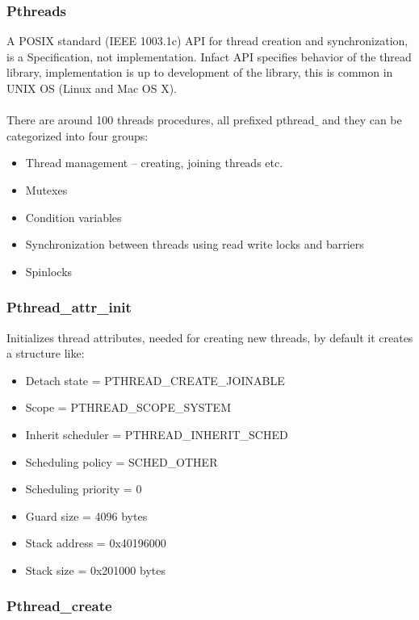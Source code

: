 \subsubsection{Pthreads}
A POSIX standard (IEEE 1003.1c) API for thread creation and synchronization, is a Specification, not implementation. Infact API specifies behavior of the thread library, implementation is up to development of the library, this is common in UNIX OS (Linux and Mac OS X).
\paragraph{}
There are around 100 threads procedures, all prefixed pthread$\_$ and
they can be categorized into four groups:

\begin{itemize}
    \item Thread management – creating, joining threads etc.
    \item Mutexes
    \item Condition variables
    \item Synchronization between threads using read write locks and
barriers
    \item  Spinlocks
\end{itemize}


\subsubsection{Pthread\_attr\_init}

Initializes thread attributes, needed for creating new threads, by default it creates a structure like:

\begin{itemize}
    \item[] Detach state = PTHREAD\_CREATE\_JOINABLE 
    \item[] Scope = PTHREAD\_SCOPE\_SYSTEM
    \item[] Inherit scheduler = PTHREAD\_INHERIT\_SCHED
    \item[] Scheduling policy = SCHED\_OTHER
    \item[] Scheduling priority = 0
    \item[] Guard size = 4096 bytes
    \item[] Stack address = 0x40196000
    \item[] Stack size = 0x201000 bytes
\end{itemize}


\subsubsection{Pthread\_create}

